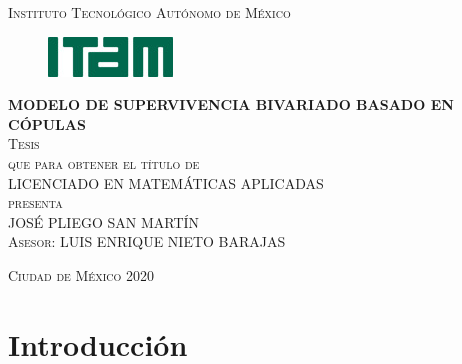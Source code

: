 \documentclass[11pt,a4paper]{article}
\begin{document}
\begin{titlepage}
\begin{center}

\textsc{\Large Instituto Tecnológico Autónomo de México}\\[4em]

\begin{figure}[h]
\begin{center}
\includegraphics{logo-ITAM_ch.jpg}
\end{center}
\end{figure}

\vspace{4em}

\textsc{\LARGE \textbf{MODELO DE SUPERVIVENCIA BIVARIADO BASADO EN CÓPULAS}}\\[4em]

\textsc{\large Tesis}\\[1em]

\textsc{que para obtener el título de}\\[1em]

\textsc{LICENCIADO EN MATEMÁTICAS APLICADAS}\\[1em]

\textsc{presenta}\\[1em]

\textsc{\Large JOSÉ PLIEGO SAN MARTÍN}\\[1em]

\textsc{\large Asesor: LUIS ENRIQUE NIETO BARAJAS}

\end{center}

\vspace*{\fill}
\textsc{Ciudad de México \hspace*{\fill} 2020}

\end{titlepage}

\tableofcontents
\listoffigures

\newpage

\setlength{\parindent}{0pt}

\section{Introducción}
\end{document}
